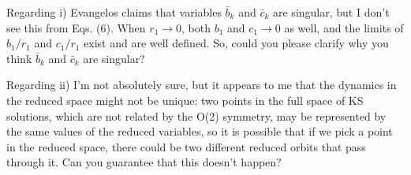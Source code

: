 \begin{description}
    Regarding i) Evangelos claims that variables $\bar{b}_k$ and $\bar{c}_k$ are singular, but I don't see this from Eqs. (6).  When $r_1 \to 0$, both $b_1$ and $c_1 \to 0$ as well, and the limits of $b_1/r_1$ and $c_1/r_1$ exist and are well defined.  So, could you please clarify why you think $\bar{b}_k$ and $\bar{c}_k$ are singular?
    
    Regarding ii) I'm not absolutely sure, but it appears to me that the dynamics in the reduced space might not be unique: two points in the full space of KS solutions, which are not related by the O(2) symmetry, may be represented by the same values of the reduced variables, so it is possible that if we pick a point in the reduced space, there could be two different reduced orbits that pass through it.  Can you guarantee that this doesn't happen?

\end{description}

\renewcommand{\ssp}{a}

